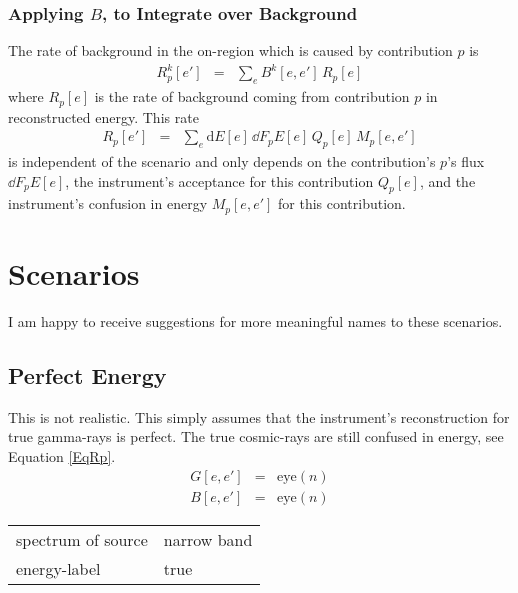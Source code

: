 \documentclass{article}%
\begin{document}
\subsubsection*{Applying $B$, to Integrate over Background}
%
The rate of background in the on-region which is caused by contribution $p$ is
%
\begin{eqnarray}
R^k_p[e'] &=& \sum_{e} B^k[e, e'] \, R_p[e]
\end{eqnarray}
%
where $R_p[e]$ is the rate of background coming from contribution $p$ in reconstructed energy.
%
This rate
%
\begin{eqnarray}
R_p[e'] &=& \sum_{e} \text{d}E[e] \, \dd{F_p}{E}[e] \, Q_p[e] \, M_p[e, e']
\label{EqRp}
\end{eqnarray}
%
 is independent of the scenario and only depends on the contribution's $p$'s flux $\dd{F_p}{E}[e]$, the instrument's acceptance for this contribution $Q_p[e]$, and the instrument's confusion in energy $M_p[e, e']$ for this contribution.
%
\section{Scenarios}
%
I am happy to receive suggestions for more meaningful names to these scenarios.
%
\subsection{Perfect Energy}
%
This is not realistic. This simply assumes that the instrument's reconstruction for true gamma-rays is perfect.
%
The true cosmic-rays are still confused in energy, see Equation \ref{EqRp}.
%
\begin{eqnarray}
G[e, e'] &=& \mathrm{eye}(n)
\\
B[e, e'] &=& \mathrm{eye}(n)
\end{eqnarray}
%
\begin{center}
\begin{tabular}{ll}
spectrum of source & narrow band\\
energy-label & true\\
\end{tabular}
\end{center}
%
\end{document}
